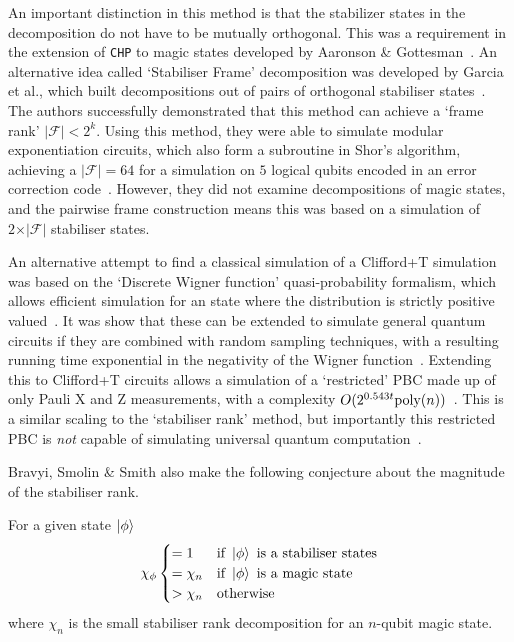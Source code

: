 \documentclass{standalone}
\begin{document}
An important distinction in this method is that the stabilizer states in the decomposition do not have to be mutually orthogonal. This was a requirement in the extension of \texttt{CHP} to magic states developed by Aaronson \& Gottesman~\cite{Aaronson2004a,Garcia2012}. An alternative idea called `Stabiliser Frame' decomposition was developed by Garcia et al., which built decompositions out of pairs of orthogonal stabiliser states~\cite{Garcia2012,Garcia2015}. The authors successfully demonstrated that this method can achieve a `frame rank' $\vert\mathcal{F}\vert < 2^{k}$. Using this method, they were able to simulate modular exponentiation circuits, which also form a subroutine in Shor's algorithm, achieving a $\vert\mathcal{F}\vert=64$ for a simulation on $5$ logical qubits encoded in an error correction code~\cite{Garcia2015}. However, they did not examine decompositions of magic states, and the pairwise frame construction means this was based on a simulation of $2\times\vert\mathcal{F}\vert$ stabiliser states.
\par
An alternative attempt to find a classical simulation of a Clifford+T simulation was based on the `Discrete Wigner function' quasi-probability formalism, which allows efficient simulation for an state where the distribution is strictly positive valued~\cite{Veitch2012,Howard2014}. It was show that these can be extended to simulate general quantum circuits if they are combined with random sampling techniques, with a resulting running time exponential in the negativity of the Wigner function~\cite{Bravyi2015,Pashayan2015}. Extending this to Clifford+T circuits allows a simulation of a `restricted' PBC made up of only Pauli X and Z measurements, with a complexity $O(2^{0.543 t}\text{poly}(n))$~\cite{Bravyi2015,Delfosse2015}. This is a similar scaling to the `stabiliser rank' method, but importantly this restricted PBC is \emph{not} capable of simulating universal quantum computation~\cite{Bravyi2015}.
\par
Bravyi, Smolin \& Smith also make the following conjecture about the magnitude of the stabiliser rank.
\par
\begin{conj}\label{thm:magicrank}
    For a given state $\ket{\phi}$
    \[\chi_{\phi} 
        \begin{cases}
            = 1 & \text{if } \ket{\phi} \text{ is a stabiliser states} \\
            = \chi_{n} & \text{if } \ket{\phi} \text{ is a magic state} \\
            > \chi_{n} & \text{otherwise} \\
        \end{cases}
    \]
    where $\chi_{n}$ is the small stabiliser rank decomposition for an $n$-qubit magic state.
\end{conj}
\end{document}
